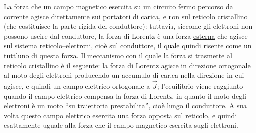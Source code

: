 La forza che un campo magnetico esercita su un circuito fermo percorso da
corrente agisce direttamente sui portatori di carica, e non sul reticolo
cristallino (che costituisce la parte rigida del conduttore): tuttavia, siccome
gli elettroni non possono uscire dal conduttore, la forza di Lorentz \`e una
forza \underline{esterna} che agisce sul sistema reticolo--elettroni, cio\`e sul
conduttore, il quale quindi risente come un tutt'uno di questa forza. Il
meccanismo con il quale la forza si trasmette al reticolo cristallino \`e il
seguente: la forza di Lorentz agisce in direzione ortogonale al moto degli
elettroni producendo un accumulo di carica nella direzione in cui agisce, e
quindi un campo elettrico ortogonale a $\vec J$; l'equilibrio viene raggiunto
quando il campo elettrico compensa la forza di Lorentz, in quanto il moto degli
elettroni \`e un moto ``su traiettoria prestabilita'', cio\`e lungo il
conduttore. A sua volta questo campo elettrico esercita una forza opposta sul
reticolo, e quindi esattamente uguale alla forza che il campo magnetico esercita
sugli elettroni.

